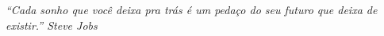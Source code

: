 \chapter*{}
\label{chp:dedicatoria}%
\thispagestyle{empty}

\null\vfill
\begin{flushright}
\emph{``Cada sonho que você deixa pra trás é um pedaço do seu futuro que deixa de existir.'' Steve Jobs} 
\end{flushright}





































































































